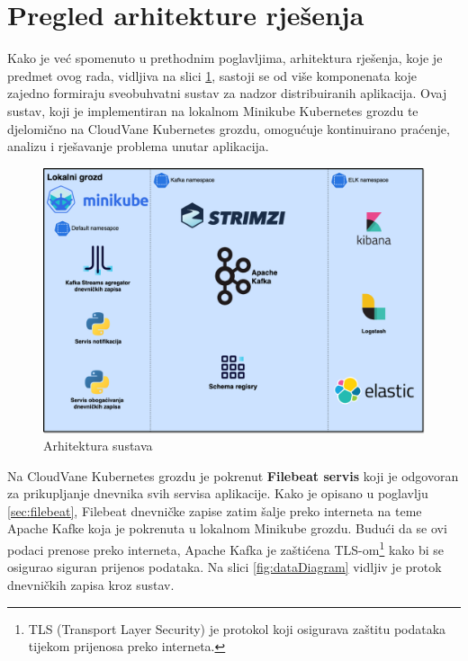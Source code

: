 \documentclass[times, utf8, diplomski]{fer}
\begin{document}
\section{Pregled arhitekture rješenja}

Kako je već spomenuto u prethodnim poglavljima, arhitektura rješenja, koje je predmet ovog rada, vidljiva na slici \ref{fig:archDiagram}, sastoji se od više komponenata koje zajedno formiraju sveobuhvatni sustav za nadzor distribuiranih aplikacija. Ovaj sustav, koji je implementiran na lokalnom Minikube Kubernetes grozdu te djelomično na CloudVane Kubernetes grozdu, omogućuje kontinuirano praćenje, analizu i rješavanje problema unutar aplikacija.\\

\begin{figure}[htb]
	\centering
	\includegraphics[width=15cm]{images/ThesisArchitecture.png}
	\caption[Arhitektura sustava]{Arhitektura sustava}
	\label{fig:archDiagram}
\end{figure}

Na CloudVane Kubernetes grozdu je pokrenut \textbf{Filebeat servis} koji je odgovoran za prikupljanje dnevnika svih servisa aplikacije. Kako je opisano u poglavlju \ref{sec:filebeat}, Filebeat dnevničke zapise zatim šalje preko interneta na teme Apache Kafke koja je pokrenuta u lokalnom Minikube grozdu. Budući da se ovi podaci prenose preko interneta, Apache Kafka je zaštićena TLS-om\footnote{TLS (Transport Layer Security) je protokol koji osigurava zaštitu podataka tijekom prijenosa preko interneta.} kako bi se osigurao siguran prijenos podataka. Na slici \ref{fig:dataDiagram} vidljiv je protok dnevničkih zapisa kroz sustav.
\end{document}
